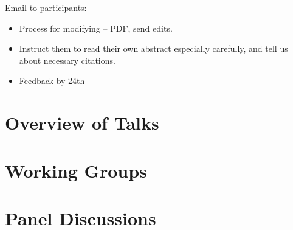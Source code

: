 \documentclass[a4paper,UKenglish]{dagrep}
\begin{document}
Email to participants:
\begin{itemize}
    \item Process for modifying -- PDF, send edits.
    \item Instruct them to read their own abstract especially carefully, and tell us about necessary citations.
    \item Feedback by 24th
\end{itemize}



\tableofcontents


\section{Overview of Talks}




















\pagebreak
\section{Working Groups}












\section{Panel Discussions}





\end{document}
